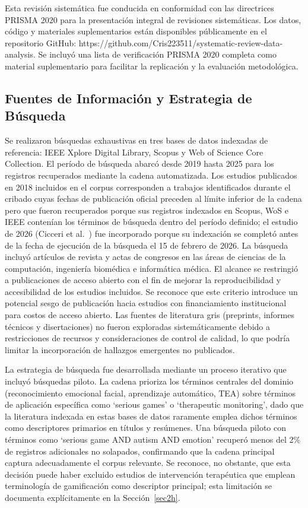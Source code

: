 \documentclass[ASNA,twocolumn]{USG}
\begin{document}
	Esta revisión sistemática fue conducida en conformidad con las directrices PRISMA
	2020 para la presentación integral de revisiones sistemáticas. Los datos, código
	y materiales suplementarios están disponibles públicamente en el repositorio
	GitHub: https://github.com/Cris223511/systematic-review-data-analysis. Se incluyó
	una lista de verificación PRISMA 2020 completa como material suplementario para
	facilitar la replicación y la evaluación metodológica.
	
	\subsection{Fuentes de Información y Estrategia de Búsqueda}\label{sec2c}
	
	Se realizaron búsquedas exhaustivas en tres bases de datos indexadas de
	referencia: IEEE Xplore Digital Library, Scopus y Web of Science Core Collection.
	El período de búsqueda abarcó desde 2019 hasta 2025 para los registros recuperados
	mediante la cadena automatizada. Los estudios publicados en 2018 incluidos en el
	corpus corresponden a trabajos identificados durante el cribado cuyas fechas de
	publicación oficial preceden al límite inferior de la cadena pero que fueron
	recuperados porque sus registros indexados en Scopus, WoS e IEEE contenían los
	términos de búsqueda dentro del período definido; el estudio de 2026 (Cicceri et al.\
	\cite{Cicceri2026}) fue incorporado porque su indexación se completó antes de la
	fecha de ejecución de la búsqueda el 15 de febrero de 2026. La búsqueda incluyó
	artículos de revista y actas de congresos en las áreas de ciencias de la computación,
	ingeniería biomédica e informática médica. El alcance se restringió a publicaciones
	de acceso abierto con el fin de mejorar la reproducibilidad y accesibilidad de los
	estudios incluidos. Se reconoce que este criterio introduce un potencial sesgo de
	publicación hacia estudios con financiamiento institucional para costos de acceso
	abierto. Las fuentes de literatura gris (preprints, informes técnicos y
	disertaciones) no fueron exploradas sistemáticamente debido a restricciones de
	recursos y consideraciones de control de calidad, lo que podría limitar la
	incorporación de hallazgos emergentes no publicados.
	
	La estrategia de búsqueda fue desarrollada mediante un proceso iterativo que
	incluyó búsquedas piloto. La cadena prioriza los términos centrales del dominio
	(reconocimiento emocional facial, aprendizaje automático, TEA) sobre términos de
	aplicación específica como `serious games' o `therapeutic monitoring', dado que
	la literatura indexada en estas bases de datos raramente emplea dichos términos
	como descriptores primarios en títulos y resúmenes. Una búsqueda piloto con
	términos como `serious game AND autism AND emotion' recuperó menos del 2\% de
	registros adicionales no solapados, confirmando que la cadena principal captura
	adecuadamente el corpus relevante. Se reconoce, no obstante, que esta decisión
	puede haber excluido estudios de intervención terapéutica que emplean terminología
	de gamificación como descriptor principal; esta limitación se documenta
	explícitamente en la Sección~\ref{sec2h}.
	
\end{document}

